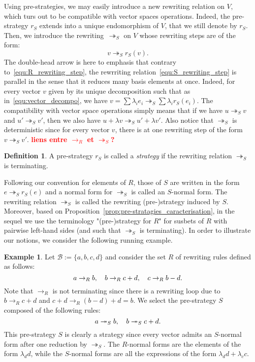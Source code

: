 \documentclass[10pt]{easychair}
\theoremstyle{definition}
\newtheorem{definition}[theorem]{Definition}
\newtheorem{example}[theorem]{Example}
\newcommand\todo[1]{{\bf\textcolor{red}{#1}}}
\newcommand\basis{\mathscr{B}}
\newcommand\rewR{\to_R}
\newcommand\rewS{\twoheadrightarrow_S}
\begin{document}
Using pre-strategies, we may easily introduce a new rewriting relation on
$V$, which turs out to be compatible with vector spaces operations.
Indeed, the pre-strategy $r_S$ extends into a unique endomorphism of $V$,
that we still denote by $r_S$. Then, we introduce the
rewriting~$\rewS$ on $V$ whose rewriting steps are of the form:
\begin{equation}\label{equ:S_rewriting_step}
  v\rewS r_S(v).
\end{equation}
The double-head arrow is here to emphasis that contrary
to~\eqref{equ:R_rewriting_step}, the rewrriting
relation~\eqref{equ:S_rewriting_step} is parallel in the sense that it
reduces many basis elements at once. Indeed, for every vector $v$ given
by its unique decomposition such that as in~\eqref{equ:vector_decompo},
we have $v=\sum\lambda_ie_i\rewS\sum\lambda_ir_S(e_i)$. The compatibility
with vector space operations simply means that if we have $u\rewS v$ and
$u'\rewS v'$, then we also have $u+\lambda v\rewS u'+\lambda v'$. Also
notice that $\rewS$ is deterministic since for every vector $v$, there is 
at one rewriting step of the form $v\rewS v'$. \todo{liens entre
  $\rewR$ et $\rewS$?}
\smallskip

\begin{definition}
  A pre-strategy $r_S$ is called a {\em strategy} if the rewriting 
  relation $\rewS$ is terminating. 
\end{definition}
\smallskip

Following our convention for elements of $R$, those of $S$ are written in
the form $e\rewS r_S(e)$ and a normal form for $\rewS$ is called an
$S$-normal form. The rewriting relation $\rewS$ is called the rewriting
(pre-)strategy induced by $S$. Moreover, based on
Proposition~\ref{prop:pre-stratagies_caracterisation}, in the sequel we
use the terminology "(pre-)strategy for $R$" for susbets of $R$ with
pairwise left-hand sides (and such that $\rewS$ is terminating). In order
to illustrate our notions, we consider the following running example.
\smallskip

\begin{example}\label{ex:h_norma_form}
  Let $\basis:=\{a,b,c,d\}$ and consider the set $R$ of rewriting rules
  defined as follows:
  \[a\rewR b,\quad b\rewR c+d,\quad c\rewR b-d.
  \smallskip\]
  Note that $\rewR$ is not terminating since there is a rewriting loop
  due to $b\rewR c+d$ and $c+d\rewR (b-d)+d=b$. We select the
  pre-strategy $S$ composed of the following rules:
  \[a\rewS b,\quad b\rewS c+d.
  \smallskip\]
  This pre-strategy $S$ is clearly a strategy since every vector admits
  an $S$-normal form after one reduction by $\rewS$. The $R$-normal forms
  are the elements of the form $\lambda_dd$, while the $S$-normal forms
  are all the expressions of the form $\lambda_dd+\lambda_cc$.
\end{example}
\end{document}
